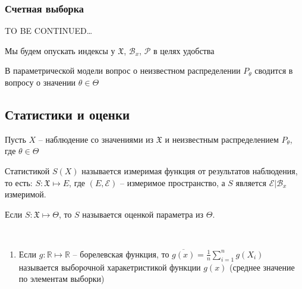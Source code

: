 \documentclass[document.tex]{subfiles}
\begin{document}
\subsubsection{Счетная выборка}
TO BE CONTINUED\ldots

\begin{remark}
	Мы будем опускать индексы у $\mathfrak{X}$, $\mathcal{B}_x$, $\mathcal{P}$ в целях удобства
\end{remark}

\begin{remark}
	В параметрической модели вопрос о неизвестном распределении $P_{\theta}$ сводится в вопросу о значении $\theta \in \Theta$
\end{remark}

\subsection{Статистики и оценки}
Пусть $X$ -- наблюдение со значениями из $\mathfrak{X}$ и неизвестным распределением $P_{\theta}$, где $\theta \in \Theta$

\begin{definition}
	Статистикой $S(X)$ называется измеримая функция от результатов наблюдения, то есть:
	$S : \mathfrak{X} \mapsto E$, где $(E, \mathcal{E})$ -- измеримое пространство, а $S$ является $\mathcal{E} | \mathcal{B}_x$ измеримой.

	Если $S : \mathfrak{X} \mapsto \Theta$, то $S$ называется оценкой параметра из $\Theta$.
\end{definition}

\begin{example}
	~\begin{enumerate}
		\item Если $g: \mathbb{R} \mapsto \mathbb{R}$ -- борелевская функция, то $\overline{g(x)} = \frac{1}{n} \sum_{i = 1}^n g(X_i)$ называется выборочной
			харакетристикой функции $g(x)$ (среднее значение по элементам выборки)
	\end{enumerate}
\end{example}
\end{document}
